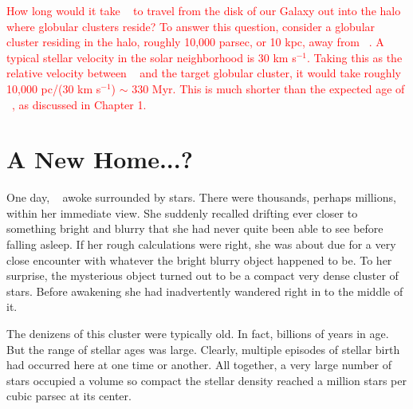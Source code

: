 \documentclass[main.tex]{subfiles}
\begin{document}
\begin{tcolorbox}[sharp corners, colback=red!30, colframe=red!80!blue, title=Travel Time]
\par \textcolor{red} {How long would it take \rmsterope~ to travel from the disk of our Galaxy out into the halo where globular clusters reside?  To answer this question, consider a globular cluster residing in the halo, roughly 10,000 parsec, or 10 kpc, away from \rmsterope~.  A typical stellar velocity in the solar neighborhood is 30 km s$^{-1}$.  Taking this as the relative velocity between \rmsterope~ and the target globular cluster, it would take roughly 10,000 pc/(30 km s$^{-1}$) $\sim$ 330 Myr.  This is much shorter than the expected age of \rmsterope~, as discussed in Chapter 1.}
\end{tcolorbox} 


\section{A New Home...?}

\par \nar One day, \rmsterope~  awoke surrounded by stars.  There were thousands, perhaps millions, within her immediate view.  She suddenly recalled drifting ever closer to something bright and blurry that she had never quite been able to see before falling asleep.  If her rough calculations were right, she was about due for a very close encounter with whatever the bright blurry object happened to be.  To her surprise, the mysterious object turned out to be a compact very dense cluster of stars.  Before awakening she had inadvertently wandered right in to the middle of it.

\par \nar The denizens of this cluster were typically old.  In fact, billions of years in age. But the range of stellar ages was large.  Clearly, multiple episodes of stellar birth had occurred here at one time or another.  All together, a very large number of stars occupied a volume so compact the stellar density reached a million stars per cubic parsec at its center.
\end{document}
